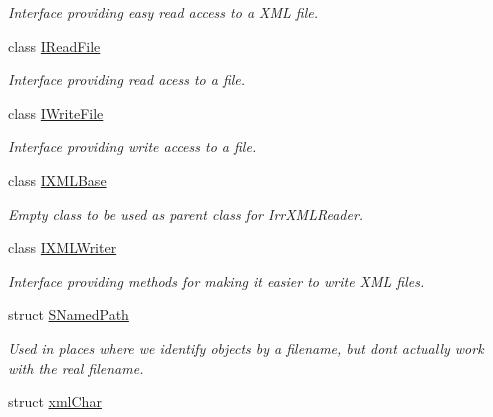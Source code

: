 \begin{DoxyCompactItemize}
\begin{DoxyCompactList}\small\item\em Interface providing easy read access to a X\+ML file. \end{DoxyCompactList}\item 
class \hyperlink{classirr_1_1io_1_1IReadFile}{I\+Read\+File}
\begin{DoxyCompactList}\small\item\em Interface providing read acess to a file. \end{DoxyCompactList}\item 
class \hyperlink{classirr_1_1io_1_1IWriteFile}{I\+Write\+File}
\begin{DoxyCompactList}\small\item\em Interface providing write access to a file. \end{DoxyCompactList}\item 
class \hyperlink{classirr_1_1io_1_1IXMLBase}{I\+X\+M\+L\+Base}
\begin{DoxyCompactList}\small\item\em Empty class to be used as parent class for Irr\+X\+M\+L\+Reader. \end{DoxyCompactList}\item 
class \hyperlink{classirr_1_1io_1_1IXMLWriter}{I\+X\+M\+L\+Writer}
\begin{DoxyCompactList}\small\item\em Interface providing methods for making it easier to write X\+ML files. \end{DoxyCompactList}\item 
struct \hyperlink{structirr_1_1io_1_1SNamedPath}{S\+Named\+Path}
\begin{DoxyCompactList}\small\item\em Used in places where we identify objects by a filename, but don\textquotesingle{}t actually work with the real filename. \end{DoxyCompactList}\item 
struct \hyperlink{structirr_1_1io_1_1xmlChar}{xml\+Char}
\end{DoxyCompactItemize}
